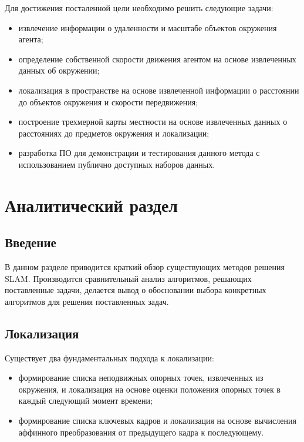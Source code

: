 Для достижения посталенной цели необходимо решить следующие задачи:
\begin{itemize}
    \item извлечение информации о удаленности и масштабе объектов окружения агента;
    \item определение собственной скорости движения агентом на основе извлеченных данных об окружении;
    \item локализация в пространстве на основе извлеченной информации о расстоянии до объектов окружения и скорости передвижения;
    \item построение трехмерной карты местности на основе извлеченных данных о расстояниях до предметов окружения и локализации;
    \item разработка ПО для демонстрации и тестирования данного метода с использованием публично доступных наборов данных.
\end{itemize}

\section{Аналитический раздел}
\subsection{Введение}
В данном разделе приводится краткий обзор существующих методов решения SLAM. Производится сравнительный анализ алгоритмов, решающих поставленные задачи, делается вывод о обосновании выбора конкретных алгоритмов для решения поставленных задач.

\subsection{Локализация}
Существует два фундаментальных подхода к локализации:
\begin{itemize}
    \item формирование списка неподвижных опорных точек, извлеченных из окружения, и локализация на основе оценки положения опорных точек в каждый следующий момент времени;
    \item формирование списка ключевых кадров и локализация на основе вычисления аффинного преобразования от предыдущего кадра к последующему.
\end{itemize}



